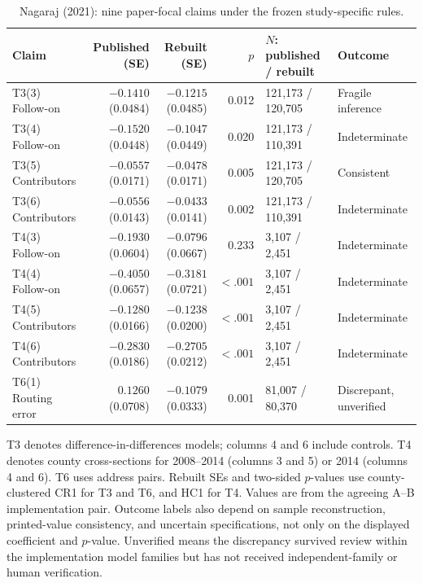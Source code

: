 \begin{table}[H]\centering\footnotesize
\setlength{\tabcolsep}{3pt}
\begin{tabularx}{\linewidth}{@{}>{\raggedright\arraybackslash}p{3.5cm}rrrY>{\raggedright\arraybackslash}p{2.3cm}@{}}\toprule
Claim & Published (SE) & Rebuilt (SE) & $p$ & $N$: published / rebuilt & Outcome\\\midrule
T3(3) Follow-on & $-0.1410$ (0.0484) & $-0.1215$ (0.0485) & 0.012 & 121,173 / 120,705 & Fragile inference\\
T3(4) Follow-on & $-0.1520$ (0.0448) & $-0.1047$ (0.0449) & 0.020 & 121,173 / 110,391 & Indeterminate\\
T3(5) Contributors & $-0.0557$ (0.0171) & $-0.0478$ (0.0171) & 0.005 & 121,173 / 120,705 & Consistent\\
T3(6) Contributors & $-0.0556$ (0.0143) & $-0.0433$ (0.0141) & 0.002 & 121,173 / 110,391 & Indeterminate\\
T4(3) Follow-on & $-0.1930$ (0.0604) & $-0.0796$ (0.0667) & 0.233 & 3,107 / 2,451 & Indeterminate\\
T4(4) Follow-on & $-0.4050$ (0.0657) & $-0.3181$ (0.0721) & $<.001$ & 3,107 / 2,451 & Indeterminate\\
T4(5) Contributors & $-0.1280$ (0.0166) & $-0.1238$ (0.0200) & $<.001$ & 3,107 / 2,451 & Indeterminate\\
T4(6) Contributors & $-0.2830$ (0.0186) & $-0.2705$ (0.0212) & $<.001$ & 3,107 / 2,451 & Indeterminate\\
T6(1) Routing error & $0.1260$ (0.0708) & $-0.1079$ (0.0333) & 0.001 & 81,007 / 80,370 & Discrepant, unverified\\
\bottomrule\end{tabularx}
\caption{Nagaraj (2021): nine paper-focal claims under the frozen study-specific rules.}\label{tab:nagaraj-focal}
\end{table}
{\footnotesize T3 denotes difference-in-differences models; columns 4 and 6 include controls. T4 denotes county cross-sections for 2008--2014 (columns 3 and 5) or 2014 (columns 4 and 6). T6 uses address pairs. Rebuilt SEs and two-sided $p$-values use county-clustered CR1 for T3 and T6, and HC1 for T4. Values are from the agreeing A--B implementation pair. Outcome labels also depend on sample reconstruction, printed-value consistency, and uncertain specifications, not only on the displayed coefficient and $p$-value. Unverified means the discrepancy survived review within the implementation model families but has not received independent-family or human verification.}
